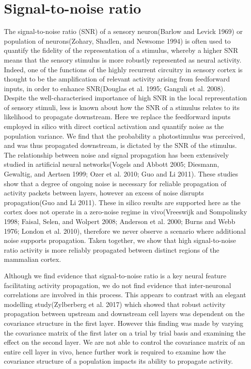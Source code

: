 \section{Signal-to-noise ratio}
The signal-to-noise ratio (SNR) of a sensory neuron(Barlow and Levick 1969) or population of neurons(Zohary, Shadlen, and Newsome 1994) is often used to quantify the fidelity of the representation of a stimulus, whereby a higher SNR means that the sensory stimulus is more robustly represented as neural activity. Indeed, one of the functions of the highly recurrent circuitry in sensory cortex is thought to be the amplification of relevant activity arising from feedforward inputs, in order to enhance SNR(Douglas et al. 1995; Ganguli et al. 2008). Despite the well-characterised importance of high SNR in the local representation of sensory stimuli, less is known about how the SNR of a stimulus relates to its likelihood to propagate downstream. Here we replace the feedforward inputs employed in silico with direct cortical activation and quantify noise as the population variance. We find that the probability a photostimulus was perceived, and was thus propagated downstream, is dictated by the SNR of the stimulus. The relationship between noise and signal propagation has been extensively studied in artificial neural networks(Vogels and Abbott 2005; Diesmann, Gewaltig, and Aertsen 1999; Ozer et al. 2010; Guo and Li 2011). These studies show that a degree of ongoing noise is necessary for reliable propagation of activity packets between layers, however an excess of noise disrupts propagation(Guo and Li 2011).  These in silico results are supported here as the cortex does not operate in a zero-noise regime in vivo(Vreeswijk and Sompolinsky 1998; Faisal, Selen, and Wolpert 2008; Anderson et al. 2000; Burns and Webb 1976; London et al. 2010), therefore we never observe a scenario where additional noise supports propagation. Taken together, we show that high signal-to-noise ratio activity is more reliably propagated between distinct regions of the mammalian cortex.

Although we find evidence that signal-to-noise ratio is a key neural feature facilitating activity propagation, we do not find evidence that inter-neuronal correlations are involved in this process. This appears to contrast with an elegant modelling study(Zylberberg et al. 2017) which showed that robust activity propagation between upstream and downstream cell layers was dependent on the covariance structure in the first layer. However this finding was made by varying the covariance matrix of the first later on a trial by trial basis and examining the effect on the second layer. We are not able to control the covariance matrix of an entire cell layer in vivo, hence further work is required to examine how the covariance structure of a population impacts its ability to propagate activity. 

